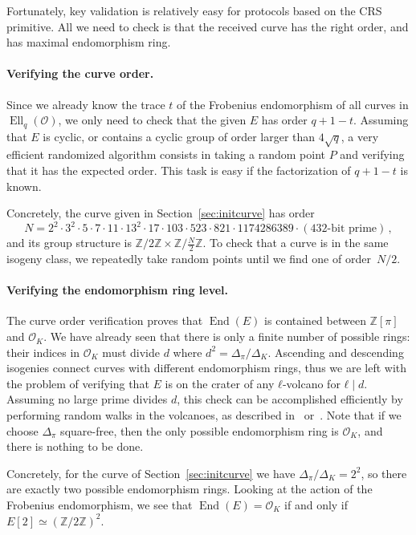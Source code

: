 \documentclass{llncs}
\renewcommand{\O}{\mathcal{O}}
\DeclareMathOperator{\End}{End}
\DeclareMathOperator{\Ell}{Ell}
\begin{document}
Fortunately, key validation is relatively easy for protocols based on
the CRS primitive. All we need to check is that the received curve has
the right order, and has maximal endomorphism ring. 

\paragraph{Verifying the curve order.} Since we already know the trace $t$
of the Frobenius endomorphism of all curves in $\Ell_q(\O)$, 
we only need to check that the given $E$ has order $q+1-t$.
Assuming that $E$ is cyclic, or contains a
cyclic group of order larger than $4\sqrt{q}$, a very efficient
randomized algorithm consists in taking a random point $P$ and
verifying that it has the expected order.  This task is easy if the
factorization of $q+1-t$ is known.

Concretely, the curve given in Section~\ref{sec:initcurve} has order
\[
    N 
    = 
    2^2 · 3^2 · 5 · 7 · 11 · 13^2 · 17 · 103 · 523 · 821 · 1174286389
    · (\text{432-bit prime})
    \,,
\] %
and its group structure is
$ℤ/2ℤ×ℤ/\frac{N}{2}ℤ$. To check that a curve is in the same isogeny
class, we repeatedly take random points until we find one of order~$N/2$.

\paragraph{Verifying the endomorphism ring level.} 
The curve order verification proves that $\End(E)$ 
is contained between $ℤ[π]$ and $\O_K$. 
We have already seen that there is only a finite number of
possible rings: their indices in $\O_K$ must divide $d$ where $d^2=Δ_π/Δ_K$.
Ascending and descending isogenies connect curves with different endomorphism
rings, thus we are left with the problem of verifying that $E$ is on
the crater of any $ℓ$-volcano for $ℓ\mid d$.
Assuming no large prime divides $d$, this check can be
accomplished efficiently by performing random walks in the volcanoes,
as described in~\cite[\S4.2]{kohel} or~\cite{fouquet+morain02}. 
Note that if we choose $Δ_π$ square-free, 
then the only possible endomorphism ring is $\O_K$,
and there is nothing to be done.

Concretely, for the curve of Section~\ref{sec:initcurve}
we have $Δ_π/Δ_K=2^2$,
so there are exactly two possible endomorphism rings. Looking at
the action of the Frobenius endomorphism, we see that $\End(E)=\O_K$
if and only if $E[2]≃(ℤ/2ℤ)^2$.
\end{document}
